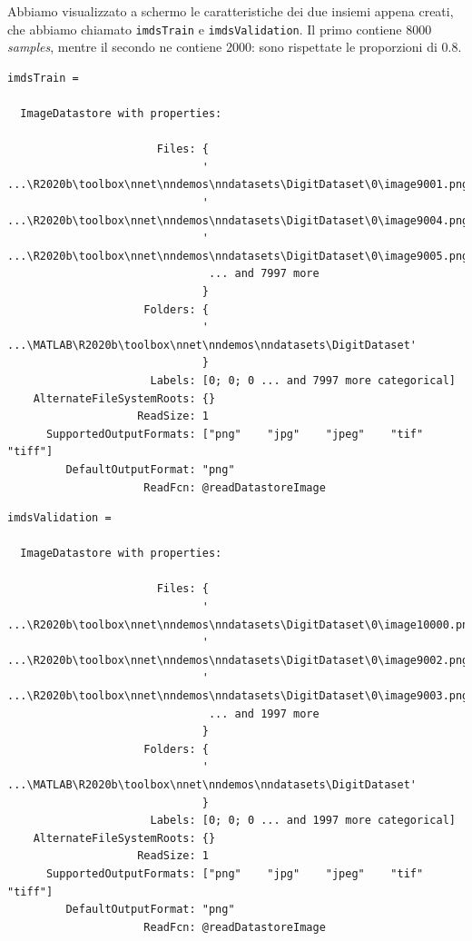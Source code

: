 \documentclass[a4paper,12pt]{article}
\begin{document}
Abbiamo visualizzato a schermo le caratteristiche dei due insiemi appena creati, che abbiamo chiamato \texttt{imdsTrain} e \texttt{imdsValidation}. Il primo contiene 8000 \emph{samples}, mentre il secondo ne contiene 2000: sono rispettate le proporzioni di $0.8$.
\begin{lstlisting}[style=Matlab-editor,title=\texttt{imdsTrain},label=lst:imdsTrain]
imdsTrain = 

  ImageDatastore with properties:

                       Files: {
                              ' ...\R2020b\toolbox\nnet\nndemos\nndatasets\DigitDataset\0\image9001.png';
                              ' ...\R2020b\toolbox\nnet\nndemos\nndatasets\DigitDataset\0\image9004.png';
                              ' ...\R2020b\toolbox\nnet\nndemos\nndatasets\DigitDataset\0\image9005.png'
                               ... and 7997 more
                              }
                     Folders: {
                              ' ...\MATLAB\R2020b\toolbox\nnet\nndemos\nndatasets\DigitDataset'
                              }
                      Labels: [0; 0; 0 ... and 7997 more categorical]
    AlternateFileSystemRoots: {}
                    ReadSize: 1
      SupportedOutputFormats: ["png"    "jpg"    "jpeg"    "tif"    "tiff"]
         DefaultOutputFormat: "png"
                     ReadFcn: @readDatastoreImage
\end{lstlisting}

\begin{lstlisting}[style=Matlab-editor,title=\texttt{imdsValidation},label=lst:imdsValidation]
imdsValidation = 

  ImageDatastore with properties:

                       Files: {
                              ' ...\R2020b\toolbox\nnet\nndemos\nndatasets\DigitDataset\0\image10000.png';
                              ' ...\R2020b\toolbox\nnet\nndemos\nndatasets\DigitDataset\0\image9002.png';
                              ' ...\R2020b\toolbox\nnet\nndemos\nndatasets\DigitDataset\0\image9003.png'
                               ... and 1997 more
                              }
                     Folders: {
                              ' ...\MATLAB\R2020b\toolbox\nnet\nndemos\nndatasets\DigitDataset'
                              }
                      Labels: [0; 0; 0 ... and 1997 more categorical]
    AlternateFileSystemRoots: {}
                    ReadSize: 1
      SupportedOutputFormats: ["png"    "jpg"    "jpeg"    "tif"    "tiff"]
         DefaultOutputFormat: "png"
                     ReadFcn: @readDatastoreImage
\end{lstlisting}
\end{document}
